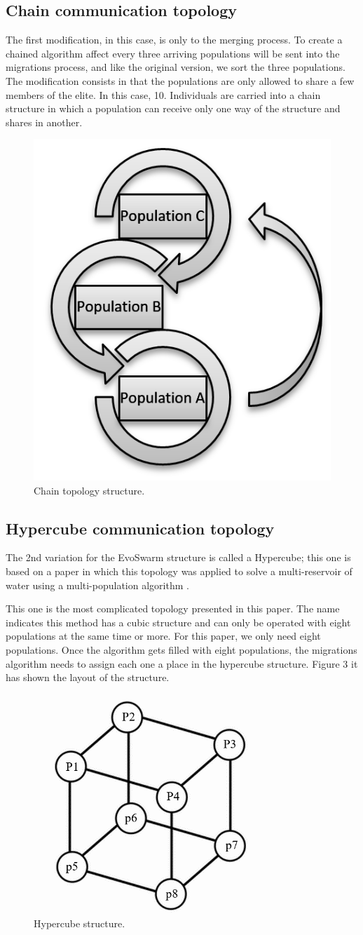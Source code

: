 \documentclass[runningheads]{llncs}
\begin{document}
\subsection{Chain communication topology}
The first modification, in this case, is only to the merging process. To create a chained algorithm affect every three arriving populations will be sent into the migrations process, and like the original version, we sort the three populations. The modification consists in that the populations are only allowed to share a few members of the elite. In this case, 10. Individuals are carried into a chain structure in which a population can receive only one way of the structure and shares in another.

\begin{figure}
\centering
{}
\includegraphics[width=0.35\linewidth]{Resources/F2.png}
\caption{Chain topology structure.}
\label{fig:example}
\end{figure}

\subsection{Hypercube communication topology}
The 2nd variation for the EvoSwarm structure is called a Hypercube; this one is based on a paper in which this topology was applied to solve a multi-reservoir of water using a multi-population algorithm \cite{b20}.  

This one is the most complicated topology presented in this paper. The name indicates this method has a cubic structure and can only be operated with eight populations at the same time or more. For this paper, we only need eight populations. Once the algorithm gets filled with eight populations, the migrations algorithm needs to assign each one a place in the hypercube structure. Figure 3 it has shown the layout of the structure.

\begin{figure}
\centering
{}
\includegraphics[width=0.35\linewidth]{Resources/F3.png}
\caption{Hypercube structure.}
\label{fig:example}
\end{figure}
\end{document}
